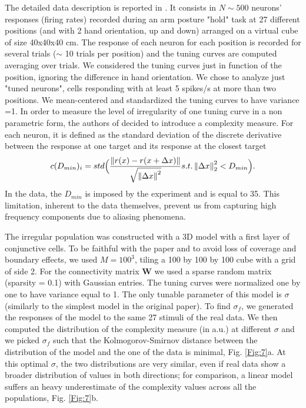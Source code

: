 \documentclass[a4paper]{article}
\begin{document}
The detailed data description is reported in \cite[]{Lalazar2016TuningConnectivity}. It consists in $N\sim 500$  neurons' responses (firing rates) recorded during an arm posture "hold" task at 27 different positions (and with 2 hand orientation, up and down) arranged on a virtual cube of size 40x40x40 cm. The response of each neuron for each position is recorded for several trials ($\sim$ 10 trials per position) and the tuning curves are computed averaging over trials.
We considered the tuning curves just in function of the position, ignoring the difference in hand orientation. We chose to analyze just "tuned neurons", cells responding with at least 5 spikes/s at more than two positions. We mean-centered and standardized the tuning curves to have variance =1. 
In order to measure the level of irregularity of one tuning curve in a non parametric form, the authors of \cite[]{Lalazar2016TuningConnectivity} decided to introduce a complexity measure. For each neuron, it is defined as the standard deviation of the discrete derivative between the response at one target and its response at the closest target
\begin{equation}
c(D_{min})_i = std\Bigl(\frac{\left \lVert r(x) - r(x+\Delta x)\right\rVert }{\sqrt{\left\lVert \Delta x\right\rVert ^2}}  s.t. \left\lVert \Delta x\right\rVert_2^2 < D_{min}\Bigr).
\end{equation}
In the data, the $D_{min}$  is imposed by the experiment and is equal to 35.  This limitation, inherent to the data themselves, prevent us from capturing high frequency components due to aliasing phenomena.

The irregular population was constructed with a 3D model with a first layer of conjunctive cells. To be faithful with the paper and to avoid loss of coverage and boundary effects, we used $M= 100^3$, tiling a 100 by 100 by 100 cube with a grid of side 2. For the connectivity matrix $\mathbf{W}$ we used a sparse random matrix (sparsity = 0.1) with Gaussian entries. The tuning curves were normalized one by one to have variance equal to 1. The only tunable parameter of this model is $\sigma$ (similarly to the simplest model in the original paper).
To find $\sigma_f$, we generated the responses of the model to the same 27 stimuli of the real data. We then computed the distribution of the complexity measure (in a.u.) at different $\sigma$ and we picked $\sigma_f$ such that the Kolmogorov-Smirnov distance between the distribution of the model and the one of the data is minimal, Fig. \ref{Fig:7}a. At this optimal $\sigma$, the two distributions are very similar, even if real data show a broader distribution of values in both directions; for comparison, a linear model suffers an heavy underestimate of the complexity values across all the populations, Fig. \ref{Fig:7}b.
\end{document}
